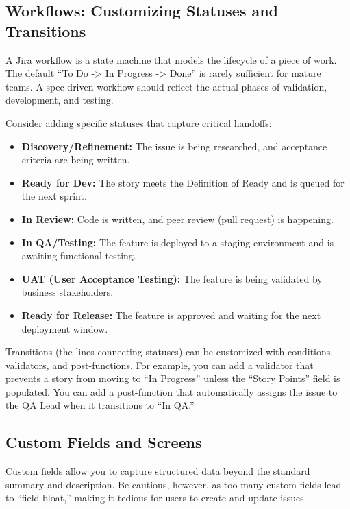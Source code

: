 \documentclass[
  11pt,
  openany,
  oneside]{book}
\providecommand{\tightlist}{%
  \setlength{\itemsep}{0pt}\setlength{\parskip}{0pt}}
\begin{document}
\subsection{Workflows: Customizing Statuses and
Transitions}\label{workflows-customizing-statuses-and-transitions}

A Jira workflow is a state machine that models the lifecycle of a piece
of work. The default ``To Do -\textgreater{} In Progress -\textgreater{}
Done'' is rarely sufficient for mature teams. A spec-driven workflow
should reflect the actual phases of validation, development, and
testing.

Consider adding specific statuses that capture critical handoffs:

\begin{itemize}
\tightlist
\item
  \textbf{Discovery/Refinement:} The issue is being researched, and
  acceptance criteria are being written.
\item
  \textbf{Ready for Dev:} The story meets the Definition of Ready and is
  queued for the next sprint.
\item
  \textbf{In Review:} Code is written, and peer review (pull request) is
  happening.
\item
  \textbf{In QA/Testing:} The feature is deployed to a staging
  environment and is awaiting functional testing.
\item
  \textbf{UAT (User Acceptance Testing):} The feature is being validated
  by business stakeholders.
\item
  \textbf{Ready for Release:} The feature is approved and waiting for
  the next deployment window.
\end{itemize}

Transitions (the lines connecting statuses) can be customized with
conditions, validators, and post-functions. For example, you can add a
validator that prevents a story from moving to ``In Progress'' unless
the ``Story Points'' field is populated. You can add a post-function
that automatically assigns the issue to the QA Lead when it transitions
to ``In QA.''

\subsection{Custom Fields and Screens}\label{custom-fields-and-screens}

Custom fields allow you to capture structured data beyond the standard
summary and description. Be cautious, however, as too many custom fields
lead to ``field bloat,'' making it tedious for users to create and
update issues.
\end{document}
